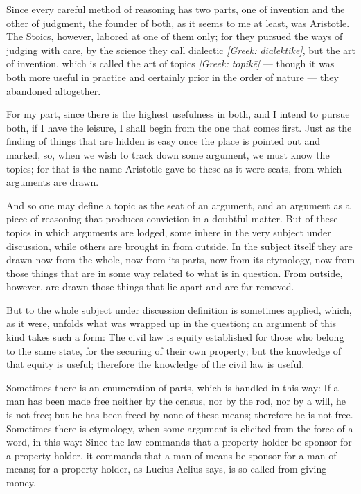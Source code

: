  Since every careful method of reasoning has two parts, one of invention and the other of judgment, the founder of both, as it seems to me at least, was Aristotle. The Stoics, however, labored at one of them only; for they pursued the ways of judging with care, by the science they call dialectic \textit{[Greek: dialektikē]}, but the art of invention, which is called the art of topics \textit{[Greek: topikē]} — though it was both more useful in practice and certainly prior in the order of nature — they abandoned altogether.

 For my part, since there is the highest usefulness in both, and I intend to pursue both, if I have the leisure, I shall begin from the one that comes first. Just as the finding of things that are hidden is easy once the place is pointed out and marked, so, when we wish to track down some argument, we must know the topics; for that is the name Aristotle gave to these as it were seats, from which arguments are drawn.

 And so one may define a topic as the seat of an argument, and an argument as a piece of reasoning that produces conviction in a doubtful matter. But of these topics in which arguments are lodged, some inhere in the very subject under discussion, while others are brought in from outside. In the subject itself they are drawn now from the whole, now from its parts, now from its etymology, now from those things that are in some way related to what is in question. From outside, however, are drawn those things that lie apart and are far removed.

 But to the whole subject under discussion definition is sometimes applied, which, as it were, unfolds what was wrapped up in the question; an argument of this kind takes such a form: The civil law is equity established for those who belong to the same state, for the securing of their own property; but the knowledge of that equity is useful; therefore the knowledge of the civil law is useful.

 Sometimes there is an enumeration of parts, which is handled in this way: If a man has been made free neither by the census, nor by the rod, nor by a will, he is not free; but he has been freed by none of these means; therefore he is not free. Sometimes there is etymology, when some argument is elicited from the force of a word, in this way: Since the law commands that a property-holder be sponsor for a property-holder, it commands that a man of means be sponsor for a man of means; for a property-holder, as Lucius Aelius says, is so called from giving money.

